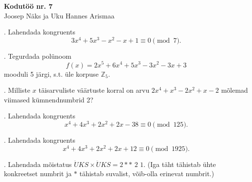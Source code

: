 \documentclass[a4paper, 10pt]{article}
\newcommand{\Z}{\mathbb{Z}}
\begin{document}
\begin{center}
\Large\textbf{Kodutöö nr. 7}\\
\small{Joosep Näks ja Uku Hannes Arismaa}
\end{center}

\bigskip

. Lahendada kongruents 
\[
3x^4 + 5 x^3 - x^2 - x +1\equiv 0\pmod{7}.
\]

\smallskip

. Tegurdada pol\"unoom  
\[
f(x)=2x^5+6x^4+5x^3-3x^2-3x+3
\] 
mooduli 5 j\"argi, s.t. \"ule korpuse $\Z_{5}$.

\bigskip

. Milliste $x$ täisarvuliste väärtuste korral on arvu $2x^4+x^3-2x^2+x-2$ mõlemad viimased kümnendnumbrid 2?

\bigskip

. Lahendada kongruents 
\[
x^4 + 4 x^3 + 2 x^2 + 2 x -38\equiv 0\pmod{125}.
\]

\smallskip

. Lahendada kongruents 
\[
x^4 + 4 x^3 + 2 x^2 + 2 x +12\equiv 0\pmod{1925}.
\]

\smallskip

. Lahendada m\~oistatus $\ddot{U}KS\times \ddot{U}KS=2\ast\ast\,\,2\,\,1$. (Iga täht t\"ahistab \"uhte konkreetset numbrit ja $\ast$ tähistab suvalist, võib-olla erinevat numbrit.)
\end{document}
